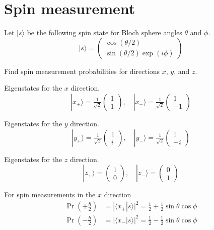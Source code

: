 

\section*{Spin measurement}

Let $|s\rangle$ be the following spin state for Bloch sphere angles $\theta$ and $\phi$.
\begin{equation*}
|s\rangle=\begin{pmatrix}
\cos(\theta/2)
\\
\sin(\theta/2)\exp(i\phi)
\end{pmatrix}
\end{equation*}

Find spin measurement probabilities for directions $x$, $y$, and $z$.

\bigskip
Eigenstates for the $x$ direction.
\begin{equation*}
|x_+\rangle=\tfrac{1}{\sqrt2}\begin{pmatrix}1\\1\end{pmatrix},
\quad
|x_-\rangle=\tfrac{1}{\sqrt2}\begin{pmatrix}1\\-1\end{pmatrix}
\end{equation*}

Eigenstates for the $y$ direction.
\begin{equation*}
|y_+\rangle=\tfrac{1}{\sqrt2}\begin{pmatrix}1\\i\end{pmatrix},
\quad
|y_-\rangle=\tfrac{1}{\sqrt2}\begin{pmatrix}1\\-i\end{pmatrix}
\end{equation*}

Eigenstates for the $z$ direction.
\begin{equation*}
|z_+\rangle=\begin{pmatrix}1\\0\end{pmatrix},
\quad
|z_-\rangle=\begin{pmatrix}0\\1\end{pmatrix}
\end{equation*}

For spin measurements in the $x$ direction
\begin{align*}
\Pr\left(+\tfrac{\hbar}{2}\right)&=|\langle x_+|s\rangle|^2=\tfrac{1}{2}+\tfrac{1}{2}\sin\theta\cos\phi
\\
\Pr\left(-\tfrac{\hbar}{2}\right)&=|\langle x_-|s\rangle|^2=\tfrac{1}{2}-\tfrac{1}{2}\sin\theta\cos\phi
\end{align*}

